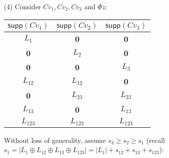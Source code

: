\documentclass[../thesis.tex]{subfiles}
\begin{document}
(4) Consider $Cv_1, Cv_2, Cv_3$ and $\Phi z$:\\

\begin{table}[h]
\centering
\begin{tabular}{ccc} 
  \hline
  $\textsf{supp}(Cv_1)$ &   $\textsf{supp}(Cv_2)$ &   $\textsf{supp}(Cv_3)$\\
  \hline
	$ L_1$ & {\bf 0 } & {\bf 0} \\
  {\bf 0}  &  $L_2$ & {\bf 0} \\
  {\bf 0} & {\bf 0} &  $L_3$ \\
 $ L_{12}$ &  $ L_{12}$ & {\bf 0 } \\
  {\bf 0} &  $ L_{23}$ &    $ L_{23}$ \\
 $ L_{13}$ & {\bf 0} &   $ L_{13}$  \\
$L_{123}$ &   $L_{123}$ &  $L_{123}$\\
  \hline
\end{tabular}
\end{table}%
\noindent 
Without loss of generality, assume $s_3\ge s_2 \ge s_1$ (recall $s_1 = \vert L_1 \oplus L_{12} \oplus L_{13} \oplus L_{123} \vert = \lvert L_1 \rvert + s_{12} + s_{13} + s_{123}$):
\end{document}
